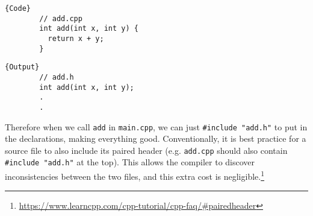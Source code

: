 \documentclass{article}
\begin{document}
    \noindent\begin{minipage}{.5\textwidth}
      \begin{lstlisting}[]{Code}
        // add.cpp
        int add(int x, int y) { 
          return x + y;
        }
      \end{lstlisting}
      \end{minipage}
      \hfill
      \begin{minipage}{.49\textwidth}
      \begin{lstlisting}[]{Output}
        // add.h 
        int add(int x, int y); 
        .
        .
      \end{lstlisting}
    \end{minipage}

    Therefore when we call \texttt{add} in \texttt{main.cpp}, we can just \texttt{\#include "add.h"} to put in the declarations, making everything good. Conventionally, it is best practice for a source file to also include its paired header (e.g. \texttt{add.cpp} should also contain \texttt{\#include "add.h"} at the top). This allows the compiler to discover inconsistencies between the two files, and this extra cost is negligible.\footnote{\href{here}{https://www.learncpp.com/cpp-tutorial/cpp-faq/\#pairedheader}} 
\end{document}
